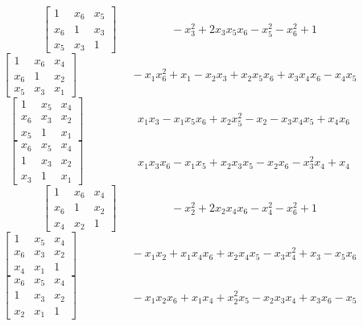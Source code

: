 \documentclass[12pt]{article}
\begin{document}
$$\left[\begin{matrix}1 & x_{6} & x_{5}\\x_{6} & 1 & x_{3}\\x_{5} & x_{3} & 1\end{matrix}\right] \hspace{2cm} - x_{3}^{2} + 2 x_{3} x_{5} x_{6} - x_{5}^{2} - x_{6}^{2} + 1$$
$$\left[\begin{matrix}1 & x_{6} & x_{4}\\x_{6} & 1 & x_{2}\\x_{5} & x_{3} & x_{1}\end{matrix}\right] \hspace{2cm} - x_{1} x_{6}^{2} + x_{1} - x_{2} x_{3} + x_{2} x_{5} x_{6} + x_{3} x_{4} x_{6} - x_{4} x_{5}$$
$$\left[\begin{matrix}1 & x_{5} & x_{4}\\x_{6} & x_{3} & x_{2}\\x_{5} & 1 & x_{1}\end{matrix}\right] \hspace{2cm} x_{1} x_{3} - x_{1} x_{5} x_{6} + x_{2} x_{5}^{2} - x_{2} - x_{3} x_{4} x_{5} + x_{4} x_{6}$$
$$\left[\begin{matrix}x_{6} & x_{5} & x_{4}\\1 & x_{3} & x_{2}\\x_{3} & 1 & x_{1}\end{matrix}\right] \hspace{2cm} x_{1} x_{3} x_{6} - x_{1} x_{5} + x_{2} x_{3} x_{5} - x_{2} x_{6} - x_{3}^{2} x_{4} + x_{4}$$
$$\left[\begin{matrix}1 & x_{6} & x_{4}\\x_{6} & 1 & x_{2}\\x_{4} & x_{2} & 1\end{matrix}\right] \hspace{2cm} - x_{2}^{2} + 2 x_{2} x_{4} x_{6} - x_{4}^{2} - x_{6}^{2} + 1$$
$$\left[\begin{matrix}1 & x_{5} & x_{4}\\x_{6} & x_{3} & x_{2}\\x_{4} & x_{1} & 1\end{matrix}\right] \hspace{2cm} - x_{1} x_{2} + x_{1} x_{4} x_{6} + x_{2} x_{4} x_{5} - x_{3} x_{4}^{2} + x_{3} - x_{5} x_{6}$$
$$\left[\begin{matrix}x_{6} & x_{5} & x_{4}\\1 & x_{3} & x_{2}\\x_{2} & x_{1} & 1\end{matrix}\right] \hspace{2cm} - x_{1} x_{2} x_{6} + x_{1} x_{4} + x_{2}^{2} x_{5} - x_{2} x_{3} x_{4} + x_{3} x_{6} - x_{5}$$
\end{document}
